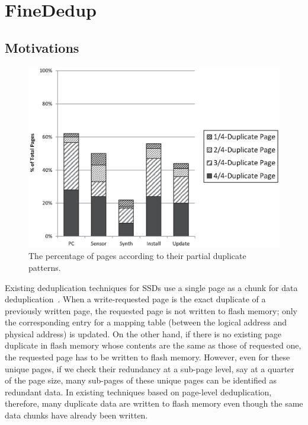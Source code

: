 \chapter{FineDedup} 
\label{chap:FineDedup}

\section{Motivations}

\begin{figure}[t]
	\center
	\includegraphics[scale=0.6]{figure/finededup/dupChunkperReq}
	\caption{The percentage of pages according to their partial duplicate patterns.} %
	\label{fig:percentage}
\end{figure}

Existing deduplication techniques for SSDs use a single page as a chunk for data deduplication~\cite{caftl,value-locality}.
When a write-requested page is the exact duplicate of a previously written page, 
the requested page is not written to flash memory; only the corresponding entry for a mapping table (between the
logical address and physical address) is updated.
On the other hand, if there is no existing page duplicate in flash memory whose contents are the same as those of requested one,
the requested page has to be written to flash memory.
However, even for these unique pages, if we check their redundancy at a sub-page level, say at a quarter of the page size,
many sub-pages of these unique pages can be identified as redundant data.
In existing techniques based on page-level deduplication, therefore, many duplicate data are written to flash memory even though 
the same data chunks have already been written.

